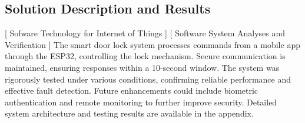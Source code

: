 \subsection{Solution Description and Results}
[ Sofware Technology for Internet of Things ] [ Software System Analyses and Verification ] 
\newline
The smart door lock system processes commands from a mobile app through the ESP32, controlling the lock mechanism. Secure communication is maintained, ensuring responses within a 10-second window. The system was rigorously tested under various conditions, confirming reliable performance and effective fault detection. Future enhancements could include biometric authentication and remote monitoring to further improve security. Detailed system architecture and testing results are available in the appendix.